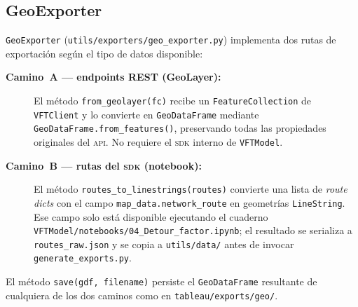 \subsection*{GeoExporter}

\texttt{GeoExporter} (\texttt{utils/exporters/geo\_exporter.py}) implementa dos
rutas de exportación según el tipo de datos disponible:

\begin{description}
    \item[\textbf{Camino~A — endpoints REST (GeoLayer):}]
    El método \texttt{from\_geolayer(fc)} recibe un
    \texttt{FeatureCollection} de \texttt{VFTClient} y lo convierte en
    \texttt{GeoDataFrame} mediante \texttt{GeoDataFrame.from\_features()},
    preservando todas las propiedades originales del \textsc{api}. No
    requiere el \textsc{sdk} interno de \texttt{VFTModel}.

    \item[\textbf{Camino~B — rutas del \textsc{sdk} (notebook):}]
    El método \texttt{routes\_to\_linestrings(routes)} convierte una lista
    de \textit{route dicts} con el campo \texttt{map\_data.network\_route}
    en geometrías \texttt{LineString}. Ese campo solo está disponible
    ejecutando el cuaderno \texttt{VFTModel/notebooks/04\_Detour\_factor.ipynb};
    el resultado se serializa a \texttt{routes\_raw.json} y se copia a
    \texttt{utils/data/} antes de invocar \texttt{generate\_exports.py}.
\end{description}

El método \texttt{save(gdf, filename)} persiste el \texttt{GeoDataFrame}
resultante de cualquiera de los dos caminos como \geojson{} en
\texttt{tableau/exports/geo/}.

